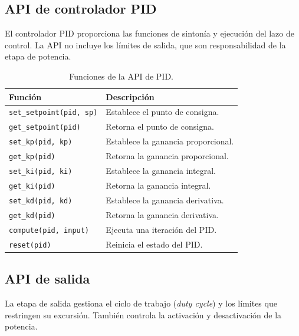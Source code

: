 \subsection{API de controlador PID}

El controlador PID proporciona las funciones de sintonía y ejecución del lazo
de control. La API no incluye los límites de salida, que son responsabilidad de
la etapa de potencia.

\begin{table}[htbp]
    \centering
    \caption{Funciones de la API de PID.}
    \label{tab:pid-api}
    \begin{tabular}{ll}
        \toprule
        \textbf{Función} & \textbf{Descripción} \\
        \midrule
        \texttt{set\_setpoint(pid, sp)} & Establece el punto de consigna. \\
        \texttt{get\_setpoint(pid)}     & Retorna el punto de consigna. \\
        \texttt{set\_kp(pid, kp)}       & Establece la ganancia proporcional. \\
        \texttt{get\_kp(pid)}           & Retorna la ganancia proporcional. \\
        \texttt{set\_ki(pid, ki)}       & Establece la ganancia integral. \\
        \texttt{get\_ki(pid)}           & Retorna la ganancia integral. \\
        \texttt{set\_kd(pid, kd)}       & Establece la ganancia derivativa. \\
        \texttt{get\_kd(pid)}           & Retorna la ganancia derivativa. \\
        \texttt{compute(pid, input)}    & Ejecuta una iteración del PID. \\
        \texttt{reset(pid)}             & Reinicia el estado del PID. \\
        \bottomrule
    \end{tabular}
\end{table}

\subsection{API de salida}

La etapa de salida gestiona el ciclo de trabajo (\textit{duty cycle}) y los
límites que restringen su excursión. También controla la activación y
desactivación de la potencia.

